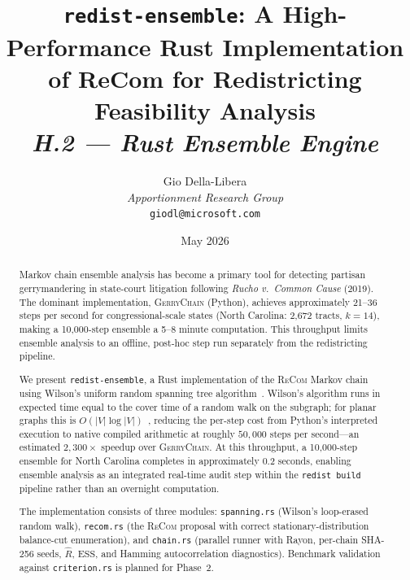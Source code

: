 \documentclass[12pt]{article}
\title{%
  \textbf{\texttt{redist-ensemble}: A High-Performance Rust Implementation}\\
  \textbf{of ReCom for Redistricting Feasibility Analysis}\\[0.8em]
  \normalsize\textit{H.2 --- Rust Ensemble Engine}%
}
\author{%
  Gio Della-Libera\\
  \textit{Apportionment Research Group}\\
  \small\texttt{giodl@microsoft.com}
}
\date{May 2026}
\newcommand{\gc}{\textsc{GerryChain}}
\newcommand{\recom}{\textsc{ReCom}}
\newcommand{\rhat}{\ensuremath{\hat{R}}}
\newcommand{\ess}{\mathrm{ESS}}
\begin{document}
\maketitle

\begin{abstract}
\noindent
Markov chain ensemble analysis has become a primary tool for detecting
partisan gerrymandering in state-court litigation following
\textit{Rucho v.\ Common Cause} (2019).
The dominant implementation, \gc{} (Python), achieves approximately
21--36 steps per second for congressional-scale states
(North Carolina: 2{,}672 tracts, $k=14$), making a 10{,}000-step
ensemble a 5--8 minute computation.
This throughput limits ensemble analysis to an offline, post-hoc step
run separately from the redistricting pipeline.

We present \texttt{redist-ensemble}, a Rust implementation of the
\recom{} Markov chain using Wilson's uniform random spanning tree
algorithm~\citep{wilson1996generating}.
Wilson's algorithm runs in expected time equal to the cover time of
a random walk on the subgraph; for planar graphs this is
$O(|V|\log|V|)$~\citep{aldous1991random}, reducing the per-step cost
from Python's interpreted execution to native compiled arithmetic at
roughly $50{,}000$ steps per second---an estimated $2{,}300\times$
speedup over \gc{}.
At this throughput, a 10{,}000-step ensemble for North Carolina completes
in approximately 0.2 seconds, enabling ensemble analysis as an integrated
real-time audit step within the \texttt{redist build} pipeline rather
than an overnight computation.

The implementation consists of three modules: \texttt{spanning.rs}
(Wilson's loop-erased random walk), \texttt{recom.rs} (the \recom{}
proposal with correct stationary-distribution balance-cut enumeration),
and \texttt{chain.rs} (parallel runner with Rayon, per-chain SHA-256
seeds, $\rhat$, $\ess$, and Hamming autocorrelation diagnostics).
Benchmark validation against \texttt{criterion.rs} is planned for Phase~2.
\end{abstract}

\tableofcontents
\newpage











\end{document}
